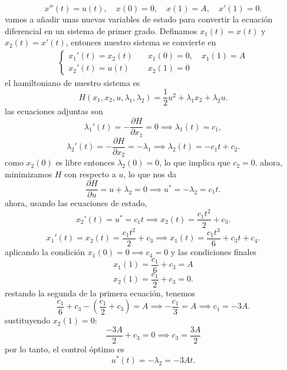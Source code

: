 \documentclass{uofa-eng-assignment}
\begin{document}
\[
x''(t) = u(t), \quad x(0) = 0, \quad x(1) = A, \quad x'(1) = 0.
\]
vamos a añadir unas nuevas variables de estado para convertir la ecuación diferencial en un sistema
de primer grado.
Definamos $x_1(t) = x(t)$ y $x_2(t) = x'(t)$, entonces nuestro sistema se convierte en
\begin{align*}
    \begin{cases}
        x_1'(t)=x_2(t) \quad &x_1(0) = 0, \quad x_1(1) = A\\
        x_2'(t)= u(t) \quad &x_2(1) = 0
    \end{cases}
\end{align*}
el hamiltoniano de nuestro sistema es
\[H(x_1, x_2, u, \lambda_1, \lambda_2) = \frac{1}{2}u^2 + \lambda_1 x_2 + \lambda_2 u.\]
las ecuaciones adjuntas son
\[\lambda_1'(t) = -\frac{\partial H}{\partial x_1} = 0 \implies \lambda_1(t) = c_1,\]
\[\lambda_2'(t) = -\frac{\partial H}{\partial x_2} = -\lambda_1 \implies \lambda_2(t) = -c_1 t + c_2.\]
como $x_2(0)$ es libre entonces $\lambda_2(0) = 0$, lo que implica que $c_2 = 0$. ahora, minimizamos $H$ con respecto a $u$, lo que nos da
\[\frac{\partial H}{\partial u} = u + \lambda_2 = 0 \implies u^* = -\lambda_2 = c_1 t.\]
ahora, usando las ecuaciones de estado,
\[x_2'(t) = u^* = c_1 t \implies x_2(t) = \frac{c_1 t^2}{2} + c_3.\]
\[x_1'(t) = x_2(t) = \frac{c_1 t^2}{2} + c_3 \implies x_1(t) = \frac{c_1 t^3}{6} + c_3 t + c_4.\]
aplicando la condición $x_1(0)=0 \implies c_4 = 0$ y las condiciones finales
\[
x_1(1) = \frac{c_1}{6}+c_3=A
\]
\[
x_2(1) = \frac{c_1}{2} + c_3 = 0.
\]
restando la segunda de la primera ecuación, tenemos
\[\frac{c_1}{6}+c_3 - \left(\frac{c_1}{2} + c_3\right) = A \implies -\frac{c_1}{3} = A \implies c_1 = -3A.\] 
sustituyendo $x_2(1) = 0$:
\[
\frac{-3A}{2}+c_3=0 \implies c_3 =\frac{3A}{2}
\]
por lo tanto, el control óptimo es
\[u^*(t) = -\lambda_2 = -3A t.\]
\end{document}
